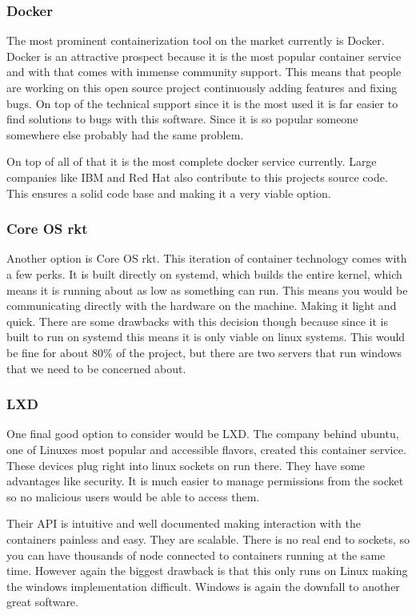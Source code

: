 \documentclass[onecolumn, draftclsnofoot,10pt, compsoc]{IEEEtran}
\begin{document}
\subsubsection{Docker}

The most prominent containerization tool on the market currently is Docker. Docker is an attractive prospect because it is the most popular container service and with that comes with immense community support. This means that people are working on this open source project continuously adding features and fixing bugs. On top of the technical support since it is the most used it is far easier to find solutions to bugs with this software. Since it is so popular someone somewhere else probably had the same problem.

On top of all of that it is the most complete docker service currently. Large companies like IBM and Red Hat also contribute to this projects source code. This ensures a solid code base and making it a very viable option.

\subsubsection{Core OS rkt}

Another option is Core OS rkt. This iteration of container technology comes with a few perks. It is built directly on systemd, which builds the entire kernel, which means it is running about as low as something can run. This means you would be communicating directly with the hardware on the machine. Making it light and quick. There are some drawbacks with this decision though because since it is built to run on systemd this means it is only viable on linux systems. This would be fine for about 80\% of the project, but there are two servers that run windows that we need to be concerned about.

\subsubsection{LXD}

One final good option to consider would be LXD. The company behind ubuntu, one of Linuxes most popular and accessible flavors, created this container service. These devices plug right into linux sockets on run there. They have some advantages like security. It is much easier to manage permissions from the socket so no malicious users would be able to access them.

Their API is intuitive and well documented making interaction with the containers painless and easy. They are scalable. There is no real end to sockets, so you can have thousands of node connected to containers running at the same time. However again the biggest drawback is that this only runs on Linux making the windows implementation difficult. Windows is again the downfall to another great software.
\end{document}
